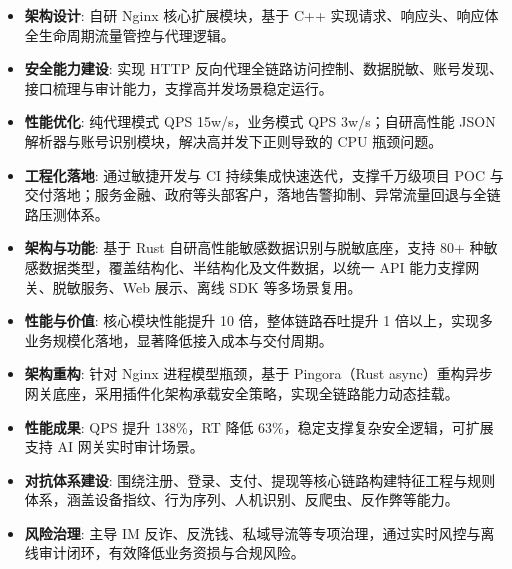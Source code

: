 
\begin{itemize}
    \item \textbf{架构设计}: 自研 Nginx 核心扩展模块，基于 C++ 实现请求、响应头、响应体全生命周期流量管控与代理逻辑。
    \item \textbf{安全能力建设}: 实现 HTTP 反向代理全链路访问控制、数据脱敏、账号发现、接口梳理与审计能力，支撑高并发场景稳定运行。
    \item \textbf{性能优化}: 纯代理模式 QPS 15w/s，业务模式 QPS 3w/s；自研高性能 JSON 解析器与账号识别模块，解决高并发下正则导致的 CPU 瓶颈问题。
    \item \textbf{工程化落地}: 通过敏捷开发与 CI 持续集成快速迭代，支撑千万级项目 POC 与交付落地；服务金融、政府等头部客户，落地告警抑制、异常流量回退与全链路压测体系。
\end{itemize}

\begin{itemize}
    \item \textbf{架构与功能}: 基于 Rust 自研高性能敏感数据识别与脱敏底座，支持 80+ 种敏感数据类型，覆盖结构化、半结构化及文件数据，以统一 API 能力支撑网关、脱敏服务、Web 展示、离线 SDK 等多场景复用。
    \item \textbf{性能与价值}: 核心模块性能提升 10 倍，整体链路吞吐提升 1 倍以上，实现多业务规模化落地，显著降低接入成本与交付周期。
\end{itemize}

\begin{itemize}
    \item \textbf{架构重构}: 针对 Nginx 进程模型瓶颈，基于 Pingora（Rust async）重构异步网关底座，采用插件化架构承载安全策略，实现全链路能力动态挂载。
    \item \textbf{性能成果}: QPS 提升 138\%，RT 降低 63\%，稳定支撑复杂安全逻辑，可扩展支持 AI 网关实时审计场景。
\end{itemize}

\vspace{0.2cm}


\begin{itemize}
    \item \textbf{对抗体系建设}: 围绕注册、登录、支付、提现等核心链路构建特征工程与规则体系，涵盖设备指纹、行为序列、人机识别、反爬虫、反作弊等能力。
    \item \textbf{风险治理}: 主导 IM 反诈、反洗钱、私域导流等专项治理，通过实时风控与离线审计闭环，有效降低业务资损与合规风险。
\end{itemize}

